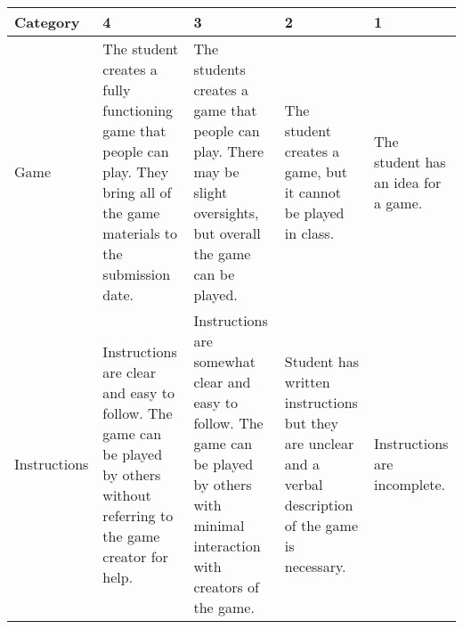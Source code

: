 \documentclass[11pt]{article}
\begin{document}
\begin{table}[]
\small
\centering
\begin{tabular}{|p{1.5cm}|p{4cm}|p{4cm}|p{4cm}|p{2.5cm}|}
\hline
\rowcolor[HTML]{C0C0C0} 
Category                  & 4                                                                                                                                                                                                                           & 3                                                                                                                                                                                                                                & 2                                                                                                                                                                             & 1                                                                                                      \\ \hline
Game                      & The student creates a fully functioning game that people can play.  They bring all of the game materials to the submission date.                                                                                          & The students creates a game that people can play.  There may be slight oversights, but overall the game can be played.                                                                                                           & The student creates a game, but it cannot be played in class.                                                                                                                 & The student has an idea for a game.                                                                    \\ \hline
Instructions              & Instructions are clear and easy to follow.  The game can be played by others without referring to the game creator for help.                                                                                                & Instructions are somewhat clear and easy to follow.  The game can be played by others with minimal interaction with creators of the game.                                                                                         & Student has written instructions but they are unclear and a verbal description of the game is necessary.                                                                      & Instructions are incomplete.                                                                           \\ \hline

\end{tabular}
\end{table}
\end{document}
